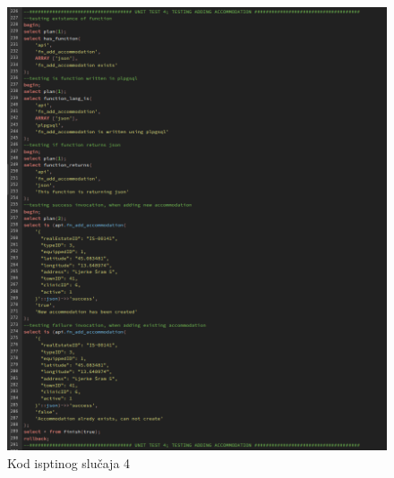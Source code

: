 				\begin{figure}[H]
					\centering
					\includegraphics[width=\textwidth]{slike/unit_tests/ut_4/code.png}
					\caption{Kod isptinog slučaja 4}
					\label{fig: IS4-kod}
				\end{figure}
				\eject

